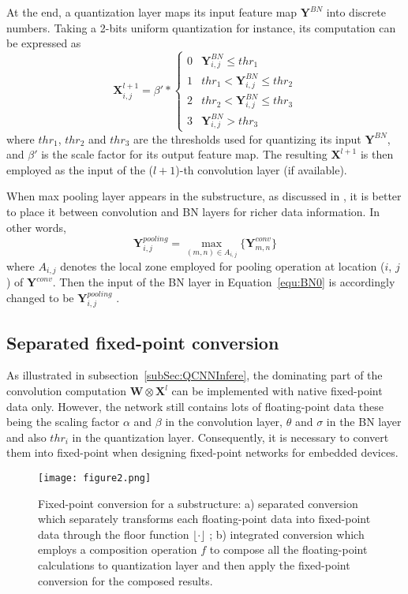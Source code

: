 \documentclass[10pt,twocolumn,letterpaper]{article}
\begin{document}
At the end, a quantization layer maps its input feature map $\textbf{Y}^{BN}$ into discrete numbers. Taking a 2-bits uniform quantization for instance, its computation can be expressed as
\begin{equation}\label{equ:quant0}
\textbf{X}^{l+1}_{i,j}=\beta{'}* \left\{
\begin{array}{cc}
0         &{      \textbf{Y}^{BN}_{i,j}  \leq  thr_1} \\
1      &{thr_1  <  \textbf{Y}^{BN}_{i,j}  \leq  thr_2} \\
2  &{thr_2< \textbf{Y}^{BN}_{i,j}  \leq  thr_3} \\
3   &{ \textbf{Y}^{BN}_{i,j} >thr_3}
\end{array}
\right.
\end{equation}
where $ thr_1$, $ thr_2$ and $ thr_3$ are the thresholds used for quantizing its input $\textbf{Y}^{BN}$, and $\beta{'}$ is the scale factor for its output feature map. The resulting $\textbf{X}^{l+1}$ is then employed as the input of the ($l+1$)-th convolution layer (if available).

When max pooling layer appears in the substructure, as discussed in \cite{XNOR}, it is better to place it between convolution and BN layers for richer data information. In other words,
\begin{equation}
\textbf{Y}^{pooling}_{i,j}=\max \limits_{(m,n)\in A_{i,j}}\{\textbf{Y}^{conv}_{m,n}\}
\end{equation}
where $A_{i,j}$ denotes the local zone employed for pooling operation at location ($i$, $j$) of $\textbf{Y}^{conv}$. Then the input of the BN layer in Equation~\ref{equ:BN0} is accordingly changed to be $\textbf{Y}^{pooling}_{i,j}$ .

\subsection{Separated fixed-point conversion} \label{sec:sepConv}
As illustrated in subsection~\ref{subSec:QCNNInfere}, the dominating part of the convolution computation $\textbf{W}\otimes \textbf{X}^l$ can be implemented with native fixed-point data only. However, the network still contains lots of floating-point data these being the scaling factor $\alpha$ and $\beta$ in the convolution layer, $\theta$ and $\sigma$ in the BN layer and also $thr_i$ in the quantization layer. Consequently, it is necessary to convert them into fixed-point when designing fixed-point networks for embedded devices.

\begin{figure}[t]
\begin{center}
\texttt{[image: figure2.png]}
\end{center}
\caption{Fixed-point conversion for a substructure: a) separated conversion which separately transforms each floating-point data into fixed-point data through the floor function $\lfloor\cdot\rfloor$ ; b) integrated conversion which employs a composition operation $f$ to compose all the floating-point calculations to quantization layer and then apply the fixed-point conversion for the composed results.}
\label{fig:fixpoint}
\end{figure}
\end{document}
